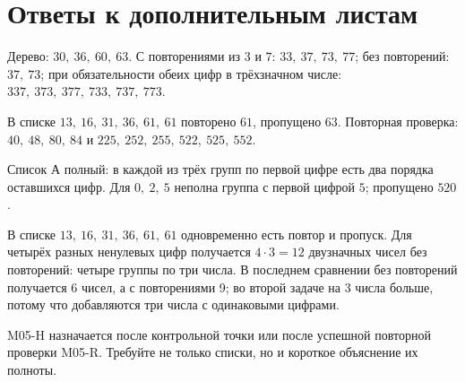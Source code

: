 \newpage
\newpage
\section{Ответы к дополнительным листам}

\begin{teacherbox}[Ответы M05-R]
  Дерево: \(30,\ 36,\ 60,\ 63\). С повторениями из \(3\) и \(7\):
  \(33,\ 37,\ 73,\ 77\); без повторений: \(37,\ 73\); при обязательности обеих
  цифр в трёхзначном числе:
  \(337,\ 373,\ 377,\ 733,\ 737,\ 773\).

  В списке \(13,\ 16,\ 31,\ 36,\ 61,\ 61\) повторено \(61\), пропущено \(63\).
  Повторная проверка: \(40,\ 48,\ 80,\ 84\) и
  \(225,\ 252,\ 255,\ 522,\ 525,\ 552\).
\end{teacherbox}

\begin{teacherbox}
  Список А полный: в каждой из трёх групп по первой цифре есть два порядка
  оставшихся цифр. Для \(0,\ 2,\ 5\) неполна группа с первой цифрой \(5\);
  пропущено \(520\).

  В списке \(13,\ 16,\ 31,\ 36,\ 61,\ 61\) одновременно есть повтор и пропуск.
  Для четырёх разных ненулевых цифр получается \(4\cdot3=12\) двузначных чисел
  без повторений: четыре группы по три числа. В последнем сравнении без
  повторений получается 6 чисел, а с повторениями \textemdash{} 9; во второй задаче
  на 3 числа больше, потому что добавляются три числа с одинаковыми цифрами.
\end{teacherbox}

\begin{notebox}
  M05-H назначается после контрольной точки или после успешной повторной
  проверки M05-R. Требуйте не только списки, но и короткое объяснение их
  полноты.
\end{notebox}
